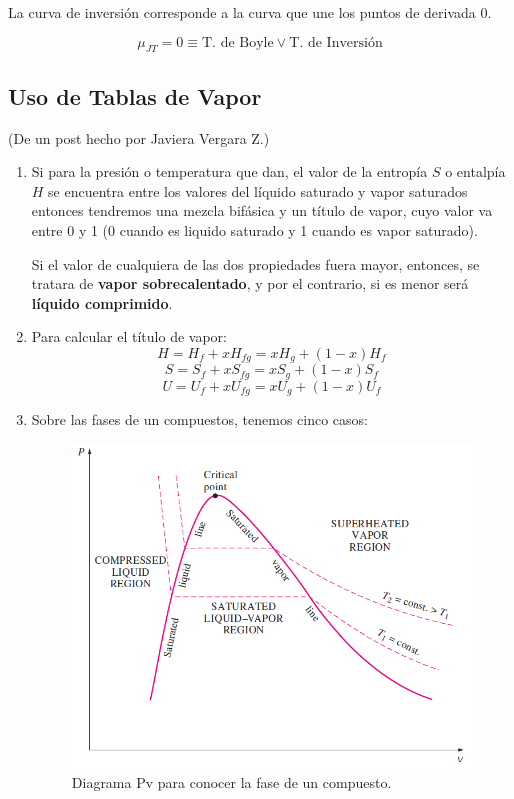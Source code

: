         La curva de inversión corresponde a la curva que une los puntos de derivada \(0\).
        
        \begin{equation}
        \label{t_de_inversion}
            \mu_{JT} = 0 \equiv \text{T. de Boyle} \vee \text{T. de Inversión}
        \end{equation}
    \newpage
        
    \subsection{Uso de Tablas de Vapor}
    
    (De un post hecho por Javiera Vergara Z.)
    
    \begin{enumerate}
        \item Si para la presión o temperatura que dan, el valor de la entropía \(S\) o entalpía \(H\) se encuentra entre los valores del líquido saturado y vapor saturados entonces tendremos una mezcla bifásica y un título de vapor, cuyo valor va entre 0 y 1 (0 cuando es liquido saturado y 1 cuando es vapor saturado).
        
        Si el valor de cualquiera de las dos propiedades fuera mayor, entonces, se tratara de \textbf{vapor sobrecalentado}, y por el contrario, si es menor será \textbf{líquido comprimido}.
        
        \item Para calcular el título de vapor:
        \[H = H_{f} + x H_{fg} = x H_{g} + (1 - x) H_{f}\]
        \[S = S_{f} + x S_{fg} = x S_{g} + (1 - x) S_{f}\]
        \[U = U_{f} + x U_{fg} = x U_{g} + (1 - x) U_{f}\]
        
        \item Sobre las fases de un compuestos, tenemos cinco casos:
        
        \begin{figure}[H]
            \centering
            \includegraphics[width=.6\textwidth]{img/clases/diagrama_pv_fases.png}
            \caption{Diagrama Pv para conocer la fase de un compuesto.}
            \label{fig:pv_fases}
        \end{figure}
        

\end{enumerate}
